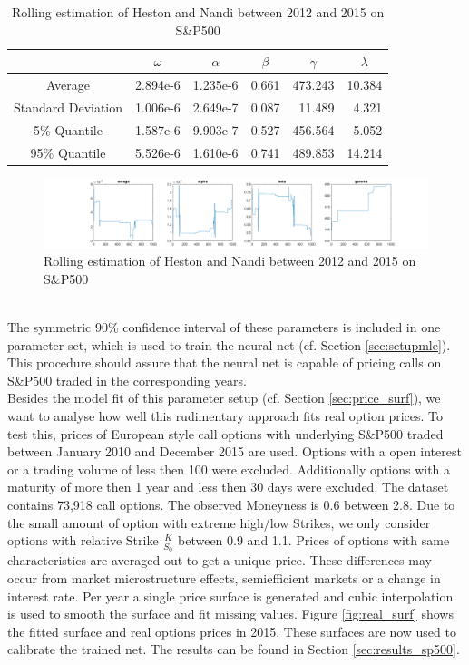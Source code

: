 \documentclass{article}
\begin{document}
\begin{table}[!ht]
\centering
\begin{tabular}{|c|r|r|r|r|r|}
\hline
 & \multicolumn{1}{c|}{$\omega$} & \multicolumn{1}{c|}{$\alpha$} & \multicolumn{1}{c|}{$\beta$} & \multicolumn{1}{c|}{$\gamma$} & \multicolumn{1}{c|}{$\lambda$} \\ \hline
Average & 2.894e-6 & 1.235e-6 & 0.661 & 473.243 & 10.384 \\ \hline
Standard Deviation & 1.006e-6 & 2.649e-7 & 0.087 & 11.489 & 4.321\\ \hline
5\% Quantile & 1.587e-6 & 9.903e-7 & 0.527 & 456.564 & 5.052 \\ \hline
95\% Quantile & 5.526e-6 & 1.610e-6 & 0.741 & 489.853 & 14.214 \\\hline
\end{tabular}\vspace{0.1cm}
\caption{Rolling estimation of Heston and Nandi between 2012 and 2015 on S\&P500\label{tab:resultsMLE}}
\end{table}
\begin{figure}[!ht]
    \centering
    \includegraphics[width=\linewidth]{parameter_mle.png}
    \caption{Rolling estimation of Heston and Nandi between 2012 and 2015 on S\&P500}
    \label{fig:paramsMLE}
\end{figure}\\
The  symmetric 90\% confidence interval of these parameters is included in one parameter set, which is used to train the neural net (cf. Section \ref{sec:setupmle}). This procedure should assure that the neural net is capable of pricing calls on S\&P500 traded in the corresponding years.\\
Besides the model fit of this parameter setup (cf. Section \ref{sec:price_surf}), we want to analyse how well this rudimentary approach fits real option prices. To test this, prices of European style call options with underlying S\&P500 traded between January 2010 and December 2015 are used. Options with a open interest or a trading volume of less then 100 were excluded. Additionally options with a maturity of more then 1 year and less then 30 days were excluded. The dataset contains 73,918 call options. The observed Moneyness is 0.6 between 2.8. Due to the small amount of option with extreme high/low Strikes, we only consider options with relative Strike $\frac{K}{S_0}$ between 0.9 and 1.1. Prices of options with same characteristics are averaged out to get a unique price. These differences may occur from market microstructure effects, semiefficient markets or a change in interest rate. Per year a single price surface is generated and cubic interpolation is used to smooth the surface and fit missing values. Figure \ref{fig:real_surf} shows the fitted surface and real options prices in 2015. These surfaces are now used to calibrate the trained net. The results can be found in Section \ref{sec:results_sp500}.
\end{document}
